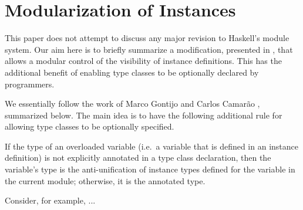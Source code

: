 \section{Modularization of Instances}
\label{sec:modular-instances}

This paper does not attempt to discuss any major revision to Haskell's
module system. Our aim here is to briefly summarize a modification,
presented in \cite{...}, that allows a modular control of the
visibility of instance definitions. This has the additional benefit of
enabling type classes to be optionally declared by programmers.

We essentially follow the work of Marco Gontijo and Carlos Camarão
\cite{Controlling-scope-instances}, summarized below. The main idea is
to have the following additional rule for allowing type classes to be
optionally specified.

\begin{definition}

If the type of an overloaded variable (i.e.~a variable that is defined
in an instance definition) is not explicitly annotated in a type class
declaration, then the variable's type is the anti-unification of
instance types defined for the variable in the current module;
otherwise, it is the annotated type.

\label{overloaded-variable-type}
\end{definition}

Consider, for example, ...



